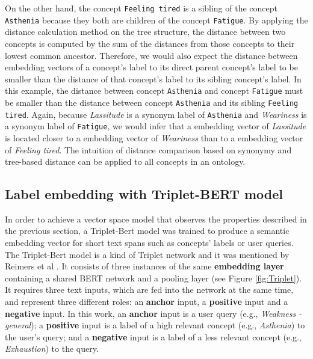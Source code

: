 \documentclass[preprint,12pt]{elsarticle}
\begin{document}
 
On the other hand, the concept \texttt{Feeling tired} is a sibling of the concept \texttt{Asthenia} because they both are children of the concept \texttt{Fatigue}. By applying the distance calculation method on the tree structure, the distance between two concepts is computed by the sum of the distances from those concepts to their lowest common ancestor. Therefore, we would also expect the  distance between embedding vectors of a concept's label to its direct parent concept's label to be smaller than the distance of that concept's label to its sibling concept's label. In this example, the distance between concept \texttt{Asthenia} and concept \texttt{Fatigue} must be smaller than the distance between concept \texttt{Asthenia} and its sibling \texttt{Feeling tired}. Again, because {\textit{Lassitude}} is a synonym label of \texttt{Asthenia} and {\textit{Weariness}} is a synonym label of \texttt{Fatigue}, we would infer that a embedding vector of {\textit{Lassitude}} is located closer to a embedding vector of {\textit{Weariness}} than to a embedding vector of  {\textit{Feeling tired}}. The intuition of distance comparison based on synonymy and tree-based distance can be applied to all concepts in an ontology.

\subsection*{Label embedding with Triplet-BERT model}
\label{sec:TripletBERT}

In order to achieve a vector space model that observes the properties described in the previous section, a Triplet-Bert model was trained to produce a semantic embedding vector for short text spans such as concepts' labels or user queries. The Triplet-Bert model is a kind of Triplet network \cite{Hoffer2015} and it was mentioned by Reimers et al \cite{Reimers2019}. It consists of three instances of the same \textbf{embedding layer} containing a shared BERT network and a pooling layer (see Figure \ref{fig:Triplet}). It requires three text inputs, which are fed into the network at the same time, and represent three different roles: an \textbf{anchor} input, a \textbf{positive} input and a \textbf{negative} input. In this work, an \textbf{anchor} input is a user query (e.g., {\textit{Weakness - general}}); a \textbf{positive} input is a label of a high relevant concept (e.g., {\textit{Asthenia}}) to the user's query; and a \textbf{negative} input is a label of a less relevant concept (e.g., {\textit{Exhaustion}}) to the query. 
\end{document}
